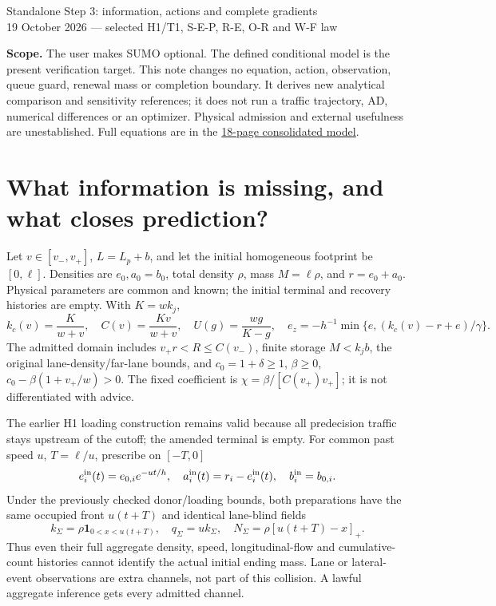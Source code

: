 \documentclass[11pt,a4paper]{article}
\begin{document}
\begin{center}
{\Large Standalone Step 3: information, actions and complete gradients}\\[4pt]
19 October 2026 --- selected H1/T1, S-E-P, R-E, O-R and W-F law
\end{center}

\textbf{Scope.} The user makes SUMO optional. The defined conditional model
is the present verification target. This note changes no equation, action,
observation, queue guard, renewal mass or completion boundary. It derives
new analytical comparison and sensitivity references; it does not run a
traffic trajectory, AD, numerical differences or an optimizer. Physical
admission and external usefulness are unestablished. Full equations are in
the \href{vsl_feedback8_full_mathematics.pdf}{18-page consolidated model}.

\section{What information is missing, and what closes prediction?}
Let $v\in[v_-,v_+]$, $L=L_p+b$, and let the initial homogeneous footprint
be $[0,\ell]$. Densities are $e_0,a_0=b_0$, total density $\rho$, mass
$M=\ell\rho$, and $r=e_0+a_0$. Physical parameters are common and known;
the initial terminal and recovery histories are empty. With $K=wk_j$,
\begin{equation}
 k_c(v)=\frac{K}{w+v},\quad C(v)=\frac{Kv}{w+v},\quad
 U(g)=\frac{wg}{K-g},\quad
 e_z=-h^{-1}\min\{e,(k_c(v)-r+e)/\gamma\}.
 \label{eq:h1}
\end{equation}
The admitted domain includes $v_+r<R\leq C(v_-)$, finite storage
$M<k_jb$, the original lane-density/far-lane bounds, and
$c_0=1+\delta\geq1$, $\beta\geq0$,
$c_0-\beta(1+v_+/w)>0$. The fixed coefficient is
$\chi=\beta/[C(v_+)v_+]$; it is not differentiated with advice.

The earlier H1 loading construction remains valid because all predecision
traffic stays upstream of the cutoff; the amended terminal is empty.
For common past speed $u$, $T=\ell/u$, prescribe on $[-T,0]$
\begin{equation}
 e_i^{\rm in}(t)=e_{0,i}e^{-ut/h},\quad
 a_i^{\rm in}(t)=r_i-e_i^{\rm in}(t),\quad b_i^{\rm in}=b_{0,i}.
 \label{eq:loading}
\end{equation}
Under the previously checked donor/loading bounds, both preparations have
the same occupied front $u(t+T)$ and identical lane-blind fields
\begin{equation}
 k_\Sigma=\rho\mathbf1_{0<x<u(t+T)},\quad
 q_\Sigma=uk_\Sigma,\quad
 N_\Sigma=\rho[u(t+T)-x]_+.
 \label{eq:collision}
\end{equation}
Thus even their full aggregate density, speed, longitudinal-flow and
cumulative-count histories cannot identify the actual initial ending mass.
Lane or lateral-event observations are extra channels, not part of this
collision. A lawful aggregate inference gets every admitted channel.
\end{document}

